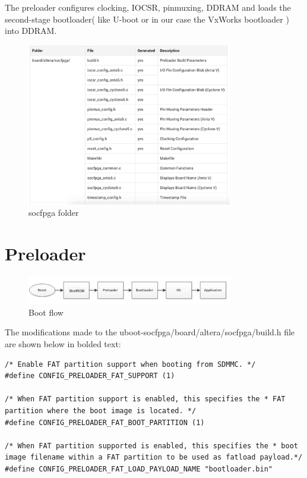 \clearpage
\newpage
The preloader configures clocking, IOCSR, pinmuxing, DDRAM and loads the second-stage bootloader( like U-boot  or in our case the VxWorks bootloader ) into DDRAM.

\begin{figure}[h]
	\centering		\includegraphics[width=0.8\textwidth]{img/folder}
	\caption{socfpga folder}
    	\label{fig:folder}
\end{figure}

\clearpage
\section{Preloader}
\label{preloader}

\begin{figure}[h]
	\centering		\includegraphics[width=0.8\textwidth]{img/bootschema1}
	\caption{Boot flow}
    	\label{fig:bootflow}
\end{figure}

The modifications made to the uboot-socfpga/board/altera/socfpga/build.h file are shown below in bolded text: 

\begin{lstlisting}[style=myCode]
/* Enable FAT partition support when booting from SDMMC. */ 
#define CONFIG_PRELOADER_FAT_SUPPORT (1)

/* When FAT partition support is enabled, this specifies the * FAT partition where the boot image is located. */
#define CONFIG_PRELOADER_FAT_BOOT_PARTITION (1)

/* When FAT partition supported is enabled, this specifies the * boot image filename within a FAT partition to be used as fatload payload.*/
#define CONFIG_PRELOADER_FAT_LOAD_PAYLOAD_NAME "bootloader.bin" 
\end{lstlisting}   

